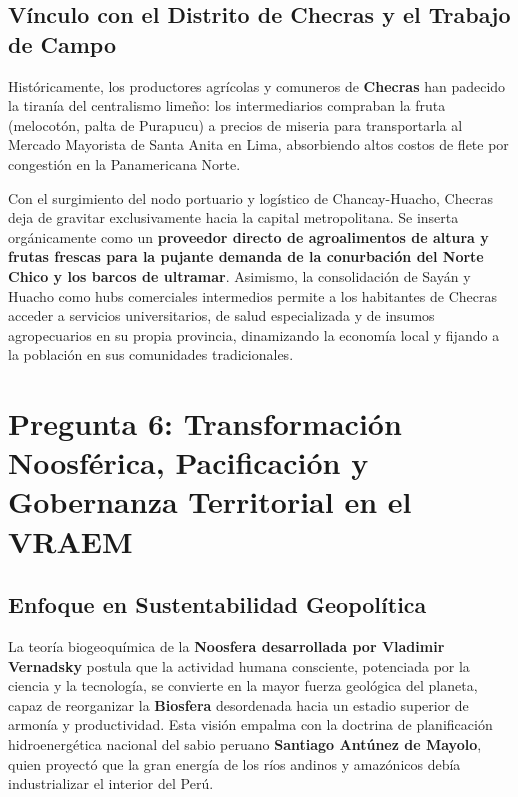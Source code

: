 \documentclass[11pt,a4paper]{article}
\begin{document}
\subsection{Vínculo con el Distrito de Checras y el Trabajo de Campo}
Históricamente, los productores agrícolas y comuneros de \textbf{Checras} han padecido la tiranía del centralismo limeño: los intermediarios compraban la fruta (melocotón, palta de Purapucu) a precios de miseria para transportarla al Mercado Mayorista de Santa Anita en Lima, absorbiendo altos costos de flete por congestión en la Panamericana Norte.

Con el surgimiento del nodo portuario y logístico de Chancay-Huacho, Checras deja de gravitar exclusivamente hacia la capital metropolitana. Se inserta orgánicamente como un \textbf{proveedor directo de agroalimentos de altura y frutas frescas para la pujante demanda de la conurbación del Norte Chico y los barcos de ultramar}. Asimismo, la consolidación de Sayán y Huacho como hubs comerciales intermedios permite a los habitantes de Checras acceder a servicios universitarios, de salud especializada y de insumos agropecuarios en su propia provincia, dinamizando la economía local y fijando a la población en sus comunidades tradicionales.


\newpage

\section{Pregunta 6: Transformación Noosférica, Pacificación y Gobernanza Territorial en el VRAEM}

\subsection{Enfoque en Sustentabilidad Geopolítica}
La teoría biogeoquímica de la \textbf{Noosfera desarrollada por Vladimir Vernadsky} postula que la actividad humana consciente, potenciada por la ciencia y la tecnología, se convierte en la mayor fuerza geológica del planeta, capaz de reorganizar la \textbf{Biosfera} desordenada hacia un estadio superior de armonía y productividad. Esta visión empalma con la doctrina de planificación hidroenergética nacional del sabio peruano \textbf{Santiago Antúnez de Mayolo}, quien proyectó que la gran energía de los ríos andinos y amazónicos debía industrializar el interior del Perú.
\end{document}
